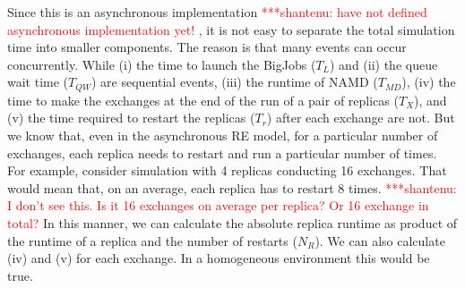 \documentclass{rspublic}
\newcommand{\jhanote}[1]{ {\textcolor{red} { ***shantenu: #1 }}}
\newcommand{\jhanote}[1]{}
\begin{document}
Since this is an asynchronous implementation\jhanote{have not defined
  asynchronous implementation yet!}  , it is not easy to separate the
total simulation time into smaller components. The reason is that many
events can occur
concurrently. %
While (i) the time to launch the BigJobs ($T_{L}$) and (ii) the queue
wait time ($T_{QW}$) are sequential events, (iii) the runtime of NAMD
($T_{MD}$), (iv) the time to make the exchanges at the end of the run
of a pair of replicas ($T_{X}$), and (v) the time required to restart
the replicas ($T_{r}$) after each exchange are not. But we know that,
even in the asynchronous RE model, for a particular number of
exchanges, each replica needs to restart and run a particular number
of times. For example, consider simulation with 4 replicas conducting
16 exchanges. That would mean that, on an average, each replica has to
restart 8 times. \jhanote{I don't see this. Is it 16 exchanges on
  average per replica? Or 16 exchange in total?} In this manner, we
can calculate the absolute replica runtime as product of the runtime
of a replica and the number of restarts ($N_{R}$). We can also
calculate (iv) and (v) for each exchange. In a homogeneous environment
this would be true.


\end{document}
